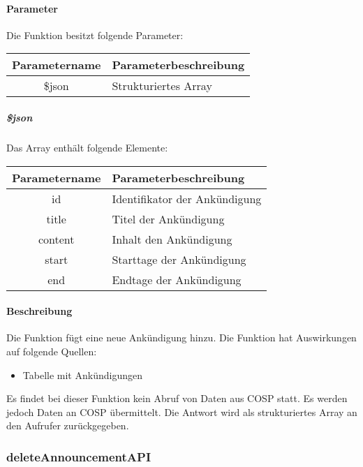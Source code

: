 \paragraph{Parameter} Die Funktion besitzt folgende Parameter:
\begin{table}[H]
	\begin{tabular}{|c|p{11cm}|}
		\hline
		\textbf{Parametername} & \textbf{Parameterbeschreibung} \\ \hline
		\$json & Strukturiertes Array \\ \hline
	\end{tabular}
\end{table}
\subparagraph{\$json}Das Array enthält folgende Elemente:
\begin{table}[H]
	\begin{tabular}{|c|p{11cm}|}
		\hline
		\textbf{Parametername} & \textbf{Parameterbeschreibung} \\ \hline
		id      & Identifikator der Ankündigung \\ \hline
		title   & Titel der Ankündigung \\ \hline
		content & Inhalt den Ankündigung \\ \hline
		start   & Starttage der Ankündigung \\ \hline
		end     & Endtage der Ankündigung \\ \hline
	\end{tabular}
\end{table}
\paragraph{Beschreibung} Die Funktion fügt eine neue Ankündigung hinzu. Die Funktion hat Auswirkungen auf folgende Quellen:
\begin{itemize}
	\item Tabelle mit Ankündigungen
\end{itemize}
Es findet bei dieser Funktion kein Abruf von Daten aus {\glqq COSP\grqq} statt. Es werden jedoch Daten an {\glqq COSP\grqq} übermittelt. Die Antwort wird als strukturiertes Array an den Aufrufer zurückgegeben.
\subsubsection{deleteAnnouncementAPI}
